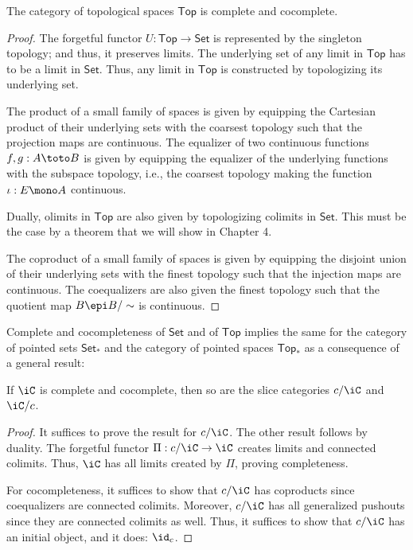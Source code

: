 \documentclass{amsart}
\begin{document}
\begin{thm}
  The category of topological spaces $\mathsf{Top}$ is complete and cocomplete.
\end{thm}
\begin{proof}
  The forgetful functor $U : \mathsf{Top} \to \mathsf{Set}$ is represented by the singleton topology; and thus, it preserves limits.
  The underlying set of any limit in $\mathsf{Top}$ has to be a limit in $\mathsf{Set}$.
  Thus, any limit in $\mathsf{Top}$ is constructed by topologizing its underlying set.

  The product of a small family of spaces is given by equipping the Cartesian product of their underlying sets with the coarsest topology such that the projection maps are continuous.
  The equalizer of two continuous functions $f,g : A \toto B$ is given by equipping the equalizer of the underlying functions with the subspace topology, i.e., the coarsest topology making the function $\iota : E \mono A$ continuous.

  Dually, olimits in $\mathsf{Top}$ are also given by topologizing colimits in $\mathsf{Set}$.
  This must be the case by a theorem that we will show in Chapter 4.

  The coproduct of a small family of spaces is given by equipping the disjoint union of their underlying sets with the finest topology such that the injection maps are continuous.
  The coequalizers are also given the finest topology such that the quotient map $B \epi B/\sim$ is continuous.
\end{proof}

Complete and cocompleteness of $\mathsf{Set}$ and of $\mathsf{Top}$ implies the same for the category of pointed sets $\mathsf{Set}_{*}$ and the category of pointed spaces $\mathsf{Top}_{*}$ as a consequence of a general result:
\begin{thm}
  If $\iC$ is complete and cocomplete, then so are the slice categories $c/\iC$ and $\iC/c$. 
\end{thm}
\begin{proof}
  It suffices to prove the result for $c/\iC$.
  The other result follows by duality.
  The forgetful functor $\Pi : c/\iC \to \iC$ creates limits and connected colimits.
  Thus, $\iC$ has all limits created by $\Pi$, proving completeness.
  
  For cocompleteness, it suffices to show that $c/\iC$ has coproducts since coequalizers are connected colimits.
  Moreover, $c/\iC$ has all generalized pushouts since they are connected colimits as well.
  Thus, it suffices to show that $c/\iC$ has an initial object, and it does: $\id_{c}$.
\end{proof}
\end{document}
